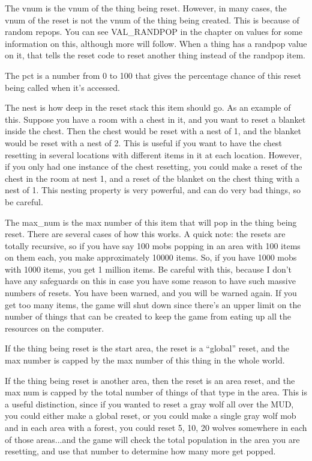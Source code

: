  The vnum is the
vnum of the thing being reset. However, in many cases, the vnum of the
reset is not the vnum of the thing being created. This is because of
random repops. You can see VAL\_RANDPOP in the chapter on values for
some information on this, although more will follow. When a thing
has a randpop value on it, that tells the reset code to reset another
thing instead of the randpop item.

The pct is a number from 0 to 100 that gives the percentage chance of
this reset being called when it's accessed.

The nest is how deep in the reset stack this item should go. As an
example of this. Suppose you have a room with a chest in it, and you
want to reset a blanket inside the chest. Then the chest would
be reset with a nest of 1, and the blanket would be reset with
a nest of 2. This is useful if you want to have the chest resetting
in several locations with different items in it at each location.
However, if you only had one instance of the chest resetting, you
could make a reset of the chest in the room at nest 1, and a reset
of the blanket on the chest thing with a nest of 1. This nesting
property is very powerful, and can do very bad things, so be careful.


The max\_num is the max number of this item that will pop in the thing
being reset. There are several cases of how this works.  A quick note:
the resets are totally recursive, so if you have say 100 mobs popping
in an area with 100 items on them each, you make approximately
10000 items. So, if you have 1000 mobs with 1000 items, you get 
1 million items. Be careful with this, because I don't have any
safeguards on this in case you have some reason to have such
massive numbers of resets. You have been warned, and you will
be warned again. If you get too many items, the game will shut down
since there's an upper limit on the number of things that can
be created to keep the game from eating up all the resources
on the computer.

If the thing being reset is the start area, the reset is a ``global'' 
reset, and the max number is capped by the max number of this
thing in the whole world.

If the thing being reset is another area, then the reset is an area
reset, and the max num is capped by the total number of things
of that type in the area. This is a useful distinction, since
if you wanted to reset a gray wolf all over the MUD, you could
either make a global reset, or you could make a single gray wolf mob
and in each area with a forest, you could reset 5, 10, 20 wolves
somewhere in each of those areas...and the game will check the
total population in the area you are resetting, and use that
number to determine how many more get popped.

